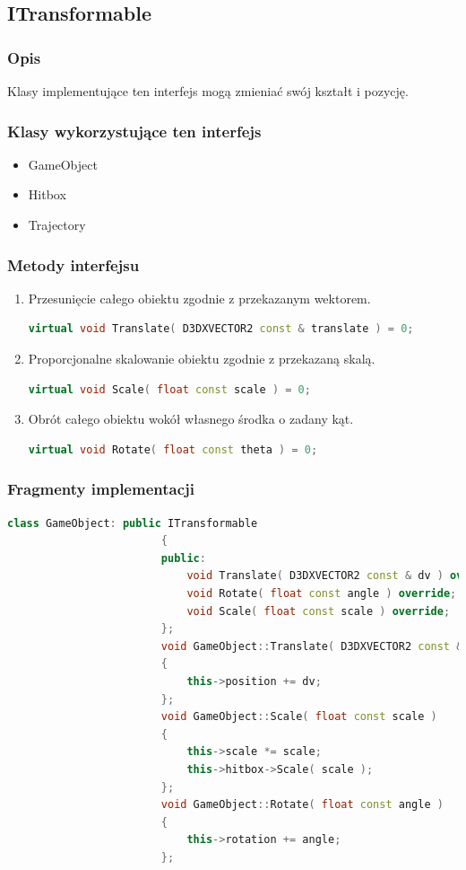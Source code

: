 \documentclass[a4paper,twoside]{article}
\begin{document}
				\subsection{ITransformable}
					\subsubsection{Opis}
						Klasy implementujące ten interfejs mogą zmieniać swój kształt i pozycję.
					\subsubsection{Klasy wykorzystujące ten interfejs}
						\begin{itemize}
							\item GameObject
							\item Hitbox
							\item Trajectory
						\end{itemize}
					\subsubsection{Metody interfejsu}
					\begin{enumerate}
						\item Przesunięcie całego obiektu zgodnie z przekazanym wektorem.
						\begin{lstlisting}[language=C++]
							virtual void Translate( D3DXVECTOR2 const & translate ) = 0;
						\end{lstlisting}
						\item Proporcjonalne skalowanie obiektu zgodnie z przekazaną skalą.
						\begin{lstlisting}[language=C++]
							virtual void Scale( float const scale ) = 0;
						\end{lstlisting}
						\item Obrót całego obiektu wokół własnego środka o zadany kąt.
						\begin{lstlisting}[language=C++]
							virtual void Rotate( float const theta ) = 0;
						\end{lstlisting}
					\end{enumerate}
					\subsubsection{Fragmenty implementacji}
					\begin{lstlisting}[language=C++]
						class GameObject: public ITransformable
						{
						public:
							void Translate( D3DXVECTOR2 const & dv ) override;
							void Rotate( float const angle ) override;
							void Scale( float const scale ) override;
						};
						void GameObject::Translate( D3DXVECTOR2 const & dv )
						{
							this->position += dv;
						};
						void GameObject::Scale( float const scale )
						{
							this->scale *= scale;
							this->hitbox->Scale( scale );
						};
						void GameObject::Rotate( float const angle )
						{
							this->rotation += angle;
						};
					\end{lstlisting}
				\newpage
\end{document}
